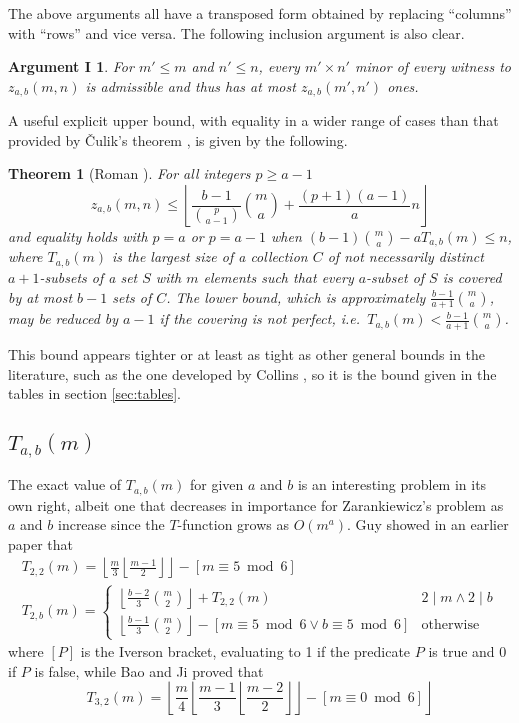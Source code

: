 \documentclass[10pt,a4paper]{article}
\newtheorem{theorem}{Theorem}[section]
\newtheorem*{argI}{Argument I}
\theoremstyle{definition}
\begin{document}
	The above arguments all have a transposed form obtained by replacing ``columns'' with ``rows'' and vice versa. The following inclusion argument is also clear.
	\begin{argI}
		For $m'\le m$ and $n'\le n$, every $m'\times n'$ minor of every witness to $z_{a,b}(m,n)$ is admissible and thus has at most $z_{a,b}(m',n')$ ones.
	\end{argI}
	
	A useful explicit upper bound, with equality in a wider range of cases than that provided by Čulik's theorem \cite{culik}, is given by the following.
	\begin{theorem}[Roman \cite{roman}]\label{thm:packlimit}
		For all integers $p\ge a-1$
		\begin{equation*}
			z_{a,b}(m,n)\le\left\lfloor\frac{b-1}{\binom p{a-1}}\binom ma+\frac{(p+1)(a-1)}an\right\rfloor
		\end{equation*}
		and equality holds with $p=a$ or $p=a-1$ when $(b-1)\binom ma-aT_{a,b}(m)\le n$, where $T_{a,b}(m)$ is the largest size of a collection $C$ of not necessarily distinct $a+1$-subsets of a set $S$ with $m$ elements such that every $a$-subset of $S$ is covered by at most $b-1$ sets of $C$. The lower bound, which is approximately $\frac{b-1}{a+1}\binom ma$, may be reduced by $a-1$ if the covering is not perfect, i.e.\ $T_{a,b}(m)<\frac{b-1}{a+1}\binom ma$.
	\end{theorem}
	
	This bound appears tighter or at least as tight as other general bounds in the literature, such as the one developed by Collins \cite{collins}, so it is the bound given in the tables in section \ref{sec:tables}.
	
	\subsection{\texorpdfstring{$T_{a,b}(m)$}{T(a,b)(m)}}
	
	The exact value of $T_{a,b}(m)$ for given $a$ and $b$ is an interesting problem in its own right, albeit one that decreases in importance for Zarankiewicz's problem as $a$ and $b$ increase since the $T$-function grows as $O(m^a)$. Guy showed in an earlier paper \cite{guy2} that
	\begin{gather*}
		T_{2,2}(m)=\left\lfloor\frac m3\left\lfloor\frac{m-1}2\right\rfloor\right\rfloor-[m\equiv5\bmod6]\\
		T_{2,b}(m)=\begin{cases}
	    \left\lfloor\frac{b-2}3\binom m2\right\rfloor+T_{2,2}(m)&2\mid m\land2\mid b\\
	    \left\lfloor\frac{b-1}3\binom m2\right\rfloor-[m\equiv5\bmod6\lor b\equiv5\bmod6]&\text{otherwise}
		\end{cases}
	\end{gather*}
	where $[P]$ is the Iverson bracket, evaluating to 1 if the predicate $P$ is true and 0 if $P$ is false, while Bao and Ji \cite{baoji} proved that
	\begin{equation*}
		T_{3,2}(m)=\left\lfloor\frac m4\left\lfloor\frac{m-1}3\left\lfloor\frac{m-2}2\right\rfloor\right\rfloor-[m\equiv0\bmod6]\right\rfloor
	\end{equation*}
\end{document}
